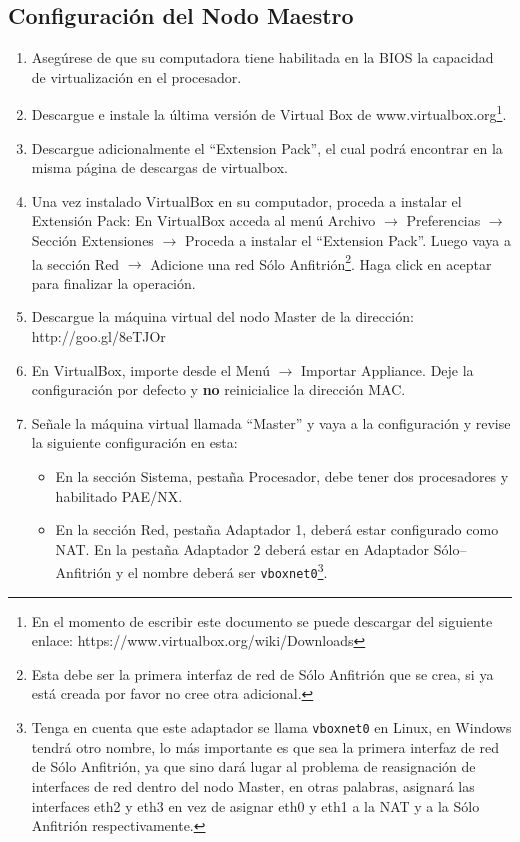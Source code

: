 \documentclass[12pt]{article}
\begin{document}
\subsection{Configuración del Nodo Maestro}
\begin{enumerate}
\item Asegúrese de que su computadora tiene habilitada en la BIOS la capacidad de virtualización en el procesador.
\item Descargue e instale la última versión de Virtual Box de www.virtualbox.org\footnote{En el momento de escribir este documento se puede descargar del siguiente enlace: https://www.virtualbox.org/wiki/Downloads}.
\item Descargue adicionalmente el ``Extension Pack'', el cual podrá encontrar en la misma página de descargas de virtualbox.
\item Una vez instalado VirtualBox en su computador, proceda a instalar el Extensión Pack: En VirtualBox acceda al menú Archivo $\rightarrow$ Preferencias $\rightarrow$ Sección Extensiones $\rightarrow$ Proceda a instalar el ``Extension Pack''. Luego vaya a la sección Red $\rightarrow$ Adicione una red Sólo Anfitrión\footnote{Esta debe ser la primera interfaz de red de Sólo Anfitrión que se crea, si ya está creada por favor no cree otra adicional.}. Haga click en aceptar para finalizar la operación.
\item Descargue la máquina virtual del nodo Master de la dirección: http://goo.gl/8eTJOr
\item En VirtualBox, importe desde el Menú $\rightarrow$ Importar Appliance. Deje la configuración por defecto y \textbf{no} reinicialice la dirección MAC.
\item Señale la máquina virtual llamada ``Master'' y vaya a la configuración y revise la siguiente configuración en esta:
  \begin{itemize}
  \item En la sección Sistema, pestaña Procesador, debe tener dos procesadores y habilitado PAE/NX.
  \item En la sección Red, pestaña Adaptador 1, deberá estar configurado como NAT. En la pestaña Adaptador 2 deberá estar en Adaptador Sólo--Anfitrión y el nombre deberá ser \texttt{vboxnet0}\footnote{Tenga en cuenta que este adaptador se llama \texttt{vboxnet0} en Linux, en Windows tendrá otro nombre, lo más importante es que sea la primera interfaz de red de Sólo Anfitrión, ya que sino dará lugar al problema de reasignación de interfaces de red dentro del nodo Master, en otras palabras, asignará las interfaces eth2 y eth3 en vez de asignar eth0 y eth1 a la NAT y a la Sólo Anfitrión respectivamente.}.

\end{itemize}
\end{enumerate}
\end{document}
